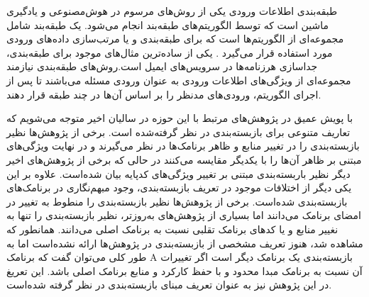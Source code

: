 طبقه‌بندی اطلاعات ورودی یکی از روش‌های مرسوم در هوش‌مصنوعی و یاد‌گیری ماشین است که توسط الگوریتم‌های طبقه‌بند انجام می‌شود. یک طبقه‌بند شامل مجموعه‌ای از الگوریتم‌ها است که برای طبقه‌بندی و یا مرتب‌سازی داده‌های ورودی مورد استفاده قرار می‌گیرد . یکی از ساده‌ترین مثال‌های موجود برای طبقه‌بندی، جدا‌سازی هرزنامه‌ها در سرویس‌های ایمیل است.روش‌های طبقه‌بندی نیازمند مجموعه‌ای از ویژگی‌های اطلاعات ورودی به عنوان ورودی مسئله‌ می‌باشند تا پس از اجرای الگوریتم، ورودی‌های مدنظر را بر اساس آن‌ها  در چند طبقه قرار دهند.



با پویش عمیق در پژوهش‌های مرتبط با این حوزه در سالیان اخیر متوجه می‌شویم که تعاریف متنوعی برای بازبسته‌بندی در نظر گرفته‌شده است. برخی از پژوهش‌ها نظیر  بازبسته‌بندی را در تغییر منابع و ظاهر برنامک‌ها در نظر می‌گیرند و در نهایت ویژگی‌های مبتنی بر ظاهر آن‌ها را با یکدیگر مقایسه می‌کنند در حالی که برخی از پژوهش‌های اخیر دیگر نظیر  باربسته‌بندی مبتنی بر تغییر ویژگی‌های کد‌پایه بیان شده‌است. علاوه بر این یکی دیگر از اختلافات موجود در تعریف بازبسته‌بندی، وجود مبهم‌نگاری در برنامک‌های بازبسته‌بندی شده‌است. برخی از پژوهش‌ها نظیر  بازبسته‌بندی را منطوط به تغییر در امضای برنامک می‌دانند اما بسیاری از پژوهش‌های به‌روز‌تر، نظیر  بازبسته‌بندی را تنها به نغییر منابع و یا کد‌های برنامک تقلبی نسبت به برنامک اصلی می‌دانند. همانطور که مشاهده‌ شد، هنوز تعریف مشخصی از بازبسته‌بندی در پژوهش‌ها ارائه‌ نشده‌است اما به طور کلی می‌توان گفت که برنامک A بازبسته‌بندی یک برنامک دیگر است اگر تغییرات آن نسبت به برنامک مبدا محدود و با حفظ کارکرد و منابع برنامک اصلی باشد. این تعریغ در این پژوهش نیز به عنوان تعریف مبنای بازبسته‌بندی در نظر گرفته شده‌است.








